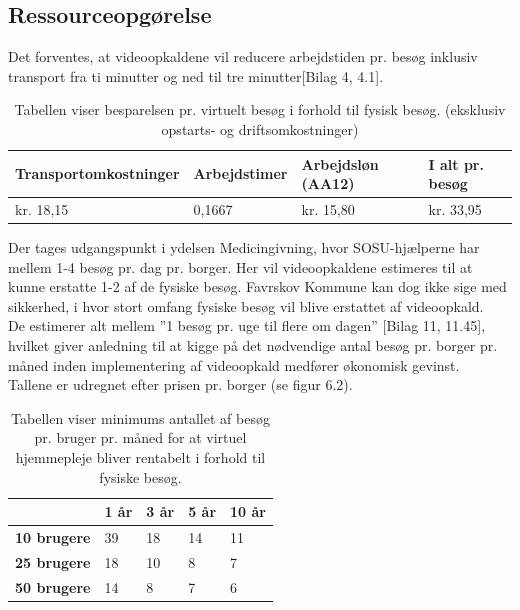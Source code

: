\subsection{Ressourceopgørelse}
Det forventes, at videoopkaldene vil reducere arbejdstiden pr. besøg inklusiv transport fra ti minutter og ned til tre minutter[Bilag 4, 4.1].

\begin{table}[H]
	\caption{Tabellen viser besparelsen pr. virtuelt besøg i forhold til fysisk besøg. (eksklusiv opstarts- og driftsomkostninger)}
	\centering
	\label{tab:tabelbesparelse}
	\begin{tabular}{|l|l|l|l|}
		\hline
		\textbf{Transportomkostninger} & \textbf{Arbejdstimer } & \textbf{Arbejdsløn (AA12)} & \textbf{I alt pr. besøg}\\ \hline
		kr. 18,15 & 0,1667 & kr. 15,80 & kr. 33,95\\ \hline
	\end{tabular}
\end{table}
Der tages udgangspunkt i ydelsen Medicingivning, hvor SOSU-hjælperne har mellem 1-4 besøg pr. dag pr. borger. Her vil videoopkaldene estimeres til at kunne erstatte 1-2 af de fysiske besøg. Favrskov Kommune kan dog ikke sige med sikkerhed, i hvor stort omfang fysiske besøg vil blive erstattet af videoopkald. \\
De estimerer alt mellem ”1 besøg pr. uge til flere om dagen” [Bilag 11, 11.45], hvilket giver anledning til at kigge på det nødvendige antal besøg pr. borger pr. måned inden implementering af videoopkald medfører økonomisk gevinst.\\
Tallene er udregnet efter prisen pr. borger (se figur 6.2).

\begin{table}[H]
	\caption{Tabellen viser minimums antallet af besøg pr. bruger pr. måned for at virtuel hjemmepleje bliver rentabelt i forhold til fysiske besøg.}
	\centering
	\label{tab:tabelminimum}
	\begin{tabular}{|l|l|l|l|l|}
		\hline
		 & \textbf{1 år} & \textbf{3 år} & \textbf{5 år} & \textbf{10 år}\\ \hline
		\textbf{10 brugere} & 39 & 18 & 14 & 11\\ \hline
		\textbf{25 brugere} & 18 & 10 & 8 & 7\\ \hline
		\textbf{50 brugere} & 14 & 8 & 7 & 6\\ \hline
	\end{tabular}
\end{table}
